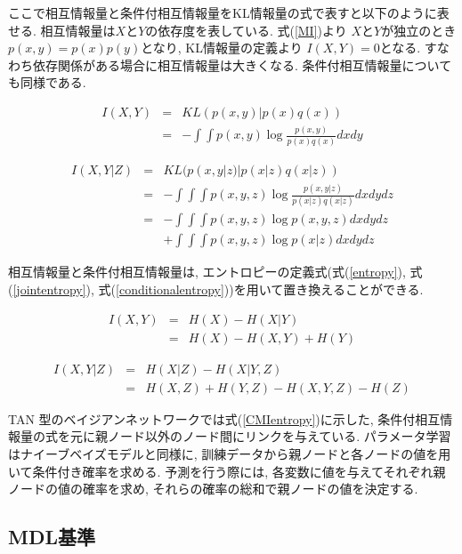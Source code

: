 \documentclass[a4j,12pt]{jarticle}
\begin{document}
ここで相互情報量と条件付相互情報量をKL情報量の式で表すと以下のように表せる. 相互情報量は$X$と$Y$の依存度を表している. 式(\ref{MI})より $X$と$Y$が独立のとき$p(x, y) = p(x) p(y)$となり, KL情報量の定義より $I(X, Y) = 0$となる. すなわち依存関係がある場合に相互情報量は大きくなる. 条件付相互情報量についても同様である. 

\begin{eqnarray}
\label{MI}
I(X, Y) &=& KL(p(x, y) | p(x) q(x)) \nonumber \\
          &=& - \int \int p(x, y) \log \frac{p(x, y)}{p(x) q(x)} dx dy 
\end{eqnarray}

\begin{eqnarray}
\label{CMI}
I(X, Y | Z) &=&  KL(p(x, y| z) | p(x|z) q(x|z)) \nonumber \\
              &=& - \int \int \int p(x, y, z) \log \frac{p(x, y|z)}{p(x|z) q(x|z)} dx dy dz \nonumber \\
               &=& - \int \int \int p(x, y, z) \log p(x, y, z) dx dy dz  \nonumber \\
                &&+ \int \int \int p(x, y, z) \log p(x| z) dx dy dz 
\end{eqnarray}

相互情報量と条件付相互情報量は, エントロピーの定義式(式(\ref{entropy}), 式(\ref{jointentropy}), 式(\ref{conditionalentropy}))を用いて置き換えることができる.  

\begin{eqnarray}
\label{MIentropy}
I(X, Y) &=& H(X) - H(X|Y) \nonumber \\
         &=& H(X) - H(X, Y) + H(Y)
\end{eqnarray}

\begin{eqnarray}
\label{CMIentropy}
I(X, Y | Z) &=& H(X| Z) - H(X| Y, Z) \nonumber \\
               &=& H(X, Z) + H(Y, Z) - H(X, Y, Z) - H(Z)
\end{eqnarray}

TAN 型のベイジアンネットワークでは式(\ref{CMIentropy})に示した, 条件付相互情報量の式を元に親ノード以外のノード間にリンクを与えている. パラメータ学習はナイーブベイズモデルと同様に,  訓練データから親ノードと各ノードの値を用いて条件付き確率を求める. 予測を行う際には, 各変数に値を与えてそれぞれ親ノードの値の確率を求め, それらの確率の総和で親ノードの値を決定する.

\subsection{MDL基準}
\end{document}
